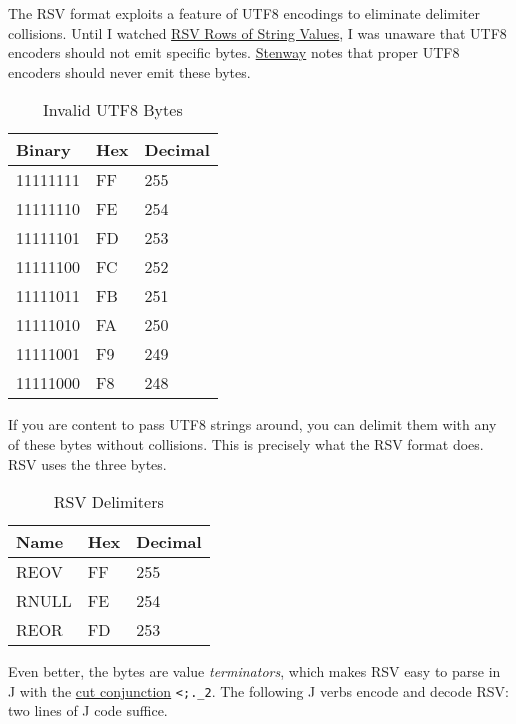 The RSV format exploits a feature of UTF8 encodings to eliminate
delimiter collisions. Until I watched
\href{https://www.youtube.com/watch?v=tb_70o6ohMA}{RSV Rows of String
Values}, I was unaware that UTF8 encoders should not emit specific
bytes. \href{https://github.com/Stenway}{Stenway} notes that proper UTF8 encoders should never emit these bytes.

\begin{longtable}[]{@{}lll@{}}
\caption{Invalid UTF8 Bytes}\\ 
\toprule
Binary & Hex & Decimal \\
\midrule
\endhead
11111111 & FF & 255 \\
11111110 & FE & 254 \\
11111101 & FD & 253 \\
11111100 & FC & 252 \\
11111011 & FB & 251 \\
11111010 & FA & 250 \\
11111001 & F9 & 249 \\
11111000 & F8 & 248 \\
\bottomrule
\end{longtable}

If you are content to pass UTF8 strings around, you can delimit them
with any of these bytes without collisions. This is precisely what the
RSV format does. RSV uses the three bytes.

\begin{longtable}[]{@{}lll@{}}
\caption{RSV Delimiters}\\ 
\toprule
Name & Hex & Decimal \\
\midrule
\endhead
REOV & FF & 255 \\
RNULL & FE & 254 \\
REOR & FD & 253 \\
\bottomrule
\end{longtable}

Even better, the bytes are value \emph{terminators}, which makes RSV
easy to parse in J with the
\href{https://code.jsoftware.com/wiki/Vocabulary/semidot}{cut
conjunction} \texttt{\textless{};.\_2}. The following J verbs encode and
decode RSV: two lines of J code suffice.


